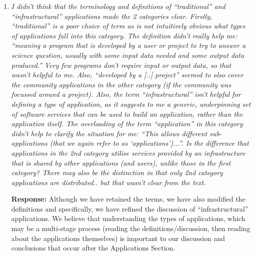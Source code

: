 \documentclass{article}
\newcommand{\katznote}[1]{{\textcolor{magenta} { ***Dan: #1 }}}
\newcommand{\katznote}[1]{}
\begin{document}
\begin{enumerate}
\textbf{Response:} \katznote{attention needed here}

\katznote{partial response:} In addition, recognizing that the two reviewers have different styles of reading
and different areas of expertise (as do we as authors), we have added a paragraph at the end
of Section 1 to explain how different types of readers might want to approach this paper.  We do
not believe that there is one single way of organizing it that would satisfy all readers.  We have also
added a longer description of each section at this same place.

\hspace{-0.7cm}Section 2. 

\item \emph{I didn't think that the terminology and definitions of ``traditional'' and ``infrastructural'' applications made the 2 categories clear. Firstly, ``traditional'' is a poor choice of term as is not intuitively obvious what types of applications fall into this category. The definition didn't really help me: ``meaning a program that is developed by a user or project to try to answer a science question, usually with some input data needed and some output data produced.'' Very few programs don't require input or output data, so that wasn't helpful to me. Also, ``developed by a [..] project'' seemed to also cover the community applications in the other category (if the community was focussed around a project). Also, the term ``infrastructural'' isn't helpful for defining a type of application, as it suggests to me a generic, underpinning set of software services that can be used to build an application, rather than the application itself. The overloading of the term ``application'' in this category didn't help to clarify the situation for me: ``This allows different sub-applications (that we again refer to as `applications')...''. Is the difference that applications in the 2nd category utilise services provided by an infrastructure that is shared by other applications (and users), unlike those in the first category? There may also be the distinction in that only 2nd category applications are distributed.. but that wasn't clear from the text.} 


\textbf{Response:} Although we have retained the terms, we have also modified the definitions and specifically, we have refined the discussion of ``infrastructural'' applications.  We believe that
understanding the types of applications, which may be a multi-stage process (reading the definitions/discussion, then reading about the applications themselves) is important to our discussion and conclusions that occur after the Applications Section.


\end{enumerate}
\end{document}
